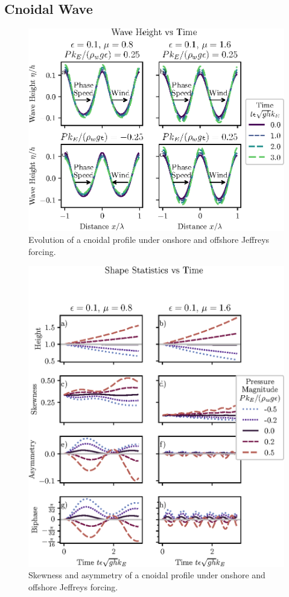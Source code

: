 \documentclass{jfm}
\let\Oldsubsection\subsection
\renewcommand{\subsection}{\FloatBarrier\Oldsubsection}
\begin{document}
\subsection{Cnoidal Wave}
\begin{figure}
  \centering
  \includegraphics{Snapshots-Positive-Negative-Cnoidal.eps}
  \caption{
    Evolution of a cnoidal profile under onshore and offshore Jeffreys
    forcing.
  }
\end{figure}

\begin{figure}
  \centering
  \includegraphics{Skew-Asymm-Cnoidal.eps}
  \caption{
    Skewness and asymmetry of a cnoidal profile under onshore and offshore
    Jeffreys forcing.
  }
\end{figure}
\end{document}
